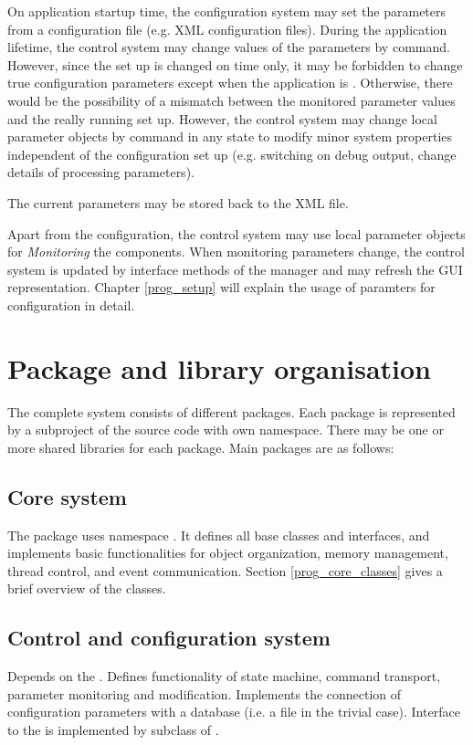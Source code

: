 On application startup time, the configuration system may 
set the parameters from a configuration file (e.g. XML configuration files). 
During the application lifetime, the control system may change 
values of the parameters by command. However, since the set 
up is changed on  time only, it may be forbidden to change 
true configuration parameters except when the application is . 
Otherwise, there would be the possibility of a mismatch between the 
monitored parameter values and the really running set up.
However, the control system may change local parameter objects 
by command in any state to modify minor system properties 
independent of the configuration set up (e.g. switching on 
debug output, change details of processing parameters).
      
The current parameters  may be stored back to the XML file.

      
Apart from the configuration, 
the control system may use local parameter objects for 
{\sl Monitoring} the components. When monitoring parameters change, 
the control system is updated by interface methods of the 
manager and may refresh the GUI representation.
Chapter \ref{prog_setup} will explain the usage of paramters for configuration
in detail. 


\section{Package and library organisation}
The complete system consists of different packages. 
Each package is represented by a subproject of the source code with own namespace. 
There may be one or more shared libraries for each package. Main packages are as follows: 




\subsection{Core system}
The  package uses namespace .
It defines all base classes and interfaces, 
and implements basic functionalities for object organization, memory management, 
thread control, and event communication. Section \ref{prog_core_classes} gives a brief overview of the
  classes.
   

\subsection{Control and configuration system}
   Depends on the . Defines 
   functionality of state machine, command transport, parameter 
   monitoring and modification. Implements the 
   connection of configuration parameters with a database 
   (i.e. a file in the trivial case). Interface to the  is 
   implemented by subclass of .
   
